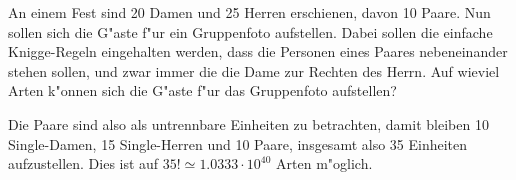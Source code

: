 An einem Fest sind 20 Damen und 25 Herren erschienen, davon
10 Paare. Nun sollen sich die G"aste f"ur ein Gruppenfoto aufstellen.
Dabei sollen die einfache Knigge-Regeln eingehalten werden, dass
die Personen eines Paares nebeneinander stehen sollen, und zwar immer
die die Dame zur Rechten des Herrn. Auf wieviel Arten k"onnen sich
die G"aste f"ur das Gruppenfoto aufstellen?

\begin{loesung}
Die Paare sind also als untrennbare Einheiten zu betrachten, damit
bleiben 10 Single-Damen, 15 Single-Herren und 10 Paare,
insgesamt also 35 Einheiten aufzustellen.
Dies ist auf $35!\simeq 1.0333\cdot 10^{40}$ Arten m"oglich.
\end{loesung}


